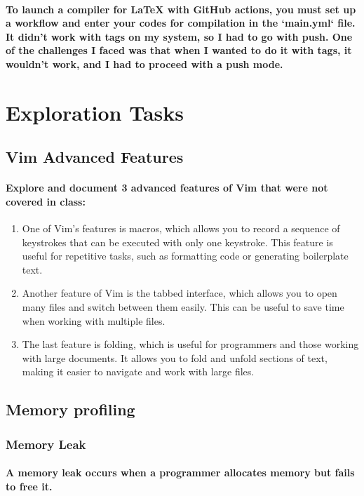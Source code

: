\documentclass[11pt]{article}
\begin{document}
\paragraph{To launch a compiler for LaTeX with GitHub actions, you must set up a workflow and enter your codes for compilation in the `main.yml` file. It didn't work with tags on my system, so I had to go with push. One of the challenges I faced was that when I wanted to do it with tags, it wouldn't work, and I had to proceed with a push mode.}

\section{Exploration Tasks}
\subsection{Vim Advanced Features}
\paragraph{Explore and document 3 advanced features of Vim that were not covered in class:}

\begin{enumerate}
    \item One of Vim's features is macros, which allows you to record a sequence of keystrokes that can be executed with only one keystroke. This feature is useful for repetitive tasks, such as formatting code or generating boilerplate text.
    \item Another feature of Vim is the tabbed interface, which allows you to open many files and switch between them easily. This can be useful to save time when working with multiple files.
    \item The last feature is folding, which is useful for programmers and those working with large documents. It allows you to fold and unfold sections of text, making it easier to navigate and work with large files.
\end{enumerate}

\subsection{Memory profiling}
\subsubsection{Memory Leak}
\paragraph{\small A memory leak occurs when a programmer allocates memory but fails to free it.}
\end{document}
